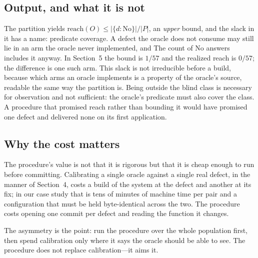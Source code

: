 \subsection{Output, and what it is not}

The partition yields $\mathrm{reach}(O) \le |\{d : \text{No}\}| / |P|$, an
\emph{upper} bound, and the slack in it has a name: predicate coverage. A defect the
oracle does not consume may still lie in an arm the oracle never implemented, and
The count of No answers includes it anyway. In Section~5 the bound is $1/57$ and the
realized reach is $0/57$; the difference is one such arm. This slack is not
irreducible before a build, because which arms an oracle implements is a property
of the oracle's source, readable the same way the partition is. Being outside the
blind class is necessary for observation and
not sufficient: the oracle's predicate must also cover the class. A procedure that
promised reach rather than bounding it would have promised one defect and delivered
none on its first application.

\subsection{Why the cost matters}

The procedure's value is not that it is rigorous but that it is cheap enough to run
before committing. Calibrating a single oracle against a single real defect, in the
manner of Section~4, costs a build of the system at the defect and another at its
fix; in our case study that is tens of minutes of machine time per pair and a
configuration that must be held byte-identical across the two. The procedure costs
opening one commit per defect and reading the function it changes.

The asymmetry is the point: run the procedure over the whole population first, then
spend calibration only where it says the oracle should be able to see. The procedure
does not replace calibration---it aims it.
